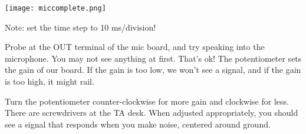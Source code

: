 \documentclass{tufte-handout}
\begin{document}
\begin{marginfigure}%
  \texttt{[image: miccomplete.png]}
  \label{fig:marginfig}
\end{marginfigure}

\bigskip
\newline
\noindent
\medskip
Note: set the time step to 10 ms/division!\par
\noindent
\medskip
Probe at the OUT terminal of the mic board, and try speaking into the microphone. You may not see anything at first. That's ok! The potentiometer sets the gain of our board. If the gain is too low, we won't see a signal, and if the gain is too high, it might rail.\par
\noindent
\medskip
Turn the potentiometer counter-clockwise for more gain and clockwise for less. There are screwdrivers at the TA desk. When adjusted appropriately, you should see a signal that responds when you make noise, centered around ground.
\end{document}
